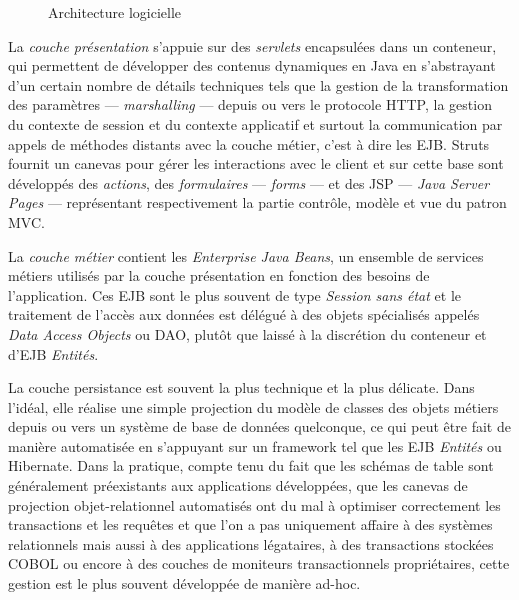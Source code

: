 \begin{figure}[htbp]
    \centering
    \caption{Architecture logicielle}
    \label{fig-archi-couche}
\end{figure}

La \emph{couche pr\'esentation} s'appuie sur des \emph{servlets}
encapsul\'ees dans un conteneur, qui
permettent de d\'evelopper des contenus dynamiques en
\textsf{Java} en s'abstrayant d'un certain nombre de d\'etails
techniques tels que la gestion de la transformation des param\`etres
--- \emph{marshalling} --- depuis ou vers le protocole \textsf{HTTP},
la gestion du contexte de session et du contexte applicatif et surtout
la communication par appels de m\'ethodes distants avec la couche
m\'etier, c'est \`a dire les
\textsf{EJB}. \textsf{Struts} fournit
un canevas pour g\'erer les interactions avec le client et sur cette
base sont d\'evelopp\'es des \emph{actions}, des \emph{formulaires}
--- \emph{forms} --- et des \textsf{JSP} --- \emph{Java Server Pages}
--- repr\'esentant respectivement la partie contr\^ole, mod\`ele
et vue du patron \textsf{MVC}. 

La \emph{couche m\'etier} contient les \emph{Enterprise Java Beans},
un ensemble de services m\'etiers utilis\'es par la couche
pr\'esentation en fonction des besoins de l'application. Ces
\textsf{EJB} sont le plus souvent de type \emph{Session sans \'etat}
et le traitement de l'acc\`es aux donn\'ees est d\'el\'egu\'e
\`a des objets sp\'ecialis\'es appel\'es \emph{Data Access
  Objects} ou \textsf{DAO}, plut\^ot que laiss\'e \`a la
discr\'etion du conteneur et d'\textsf{EJB} \emph{Entit\'es}. 

La couche persistance est souvent la plus technique et la plus
d\'elicate. Dans l'id\'eal, elle r\'ealise une simple projection du
mod\`ele de classes des objets m\'etiers depuis ou vers un syst\`eme de base
de donn\'ees quelconque, ce qui peut \^etre fait de mani\`ere
automatis\'ee en s'appuyant sur un framework tel que les EJB
\emph{Entit\'es} ou \textsf{Hibernate}. Dans la pratique, compte tenu du fait
que les sch\'emas de table sont g\'en\'eralement pr\'eexistants
aux applications d\'evelopp\'ees, que les canevas de projection
objet-relationnel automatis\'es ont du mal \`a optimiser
correctement les transactions et les requ\^etes et que l'on a pas
uniquement affaire \`a des syst\`emes relationnels mais aussi
\`a des applications l\'egataires, \`a des transactions stock\'ees
\textsf{COBOL} ou encore \`a des couches de moniteurs transactionnels
propri\'etaires, cette gestion est le
plus souvent d\'evelopp\'ee de mani\`ere ad-hoc. 

